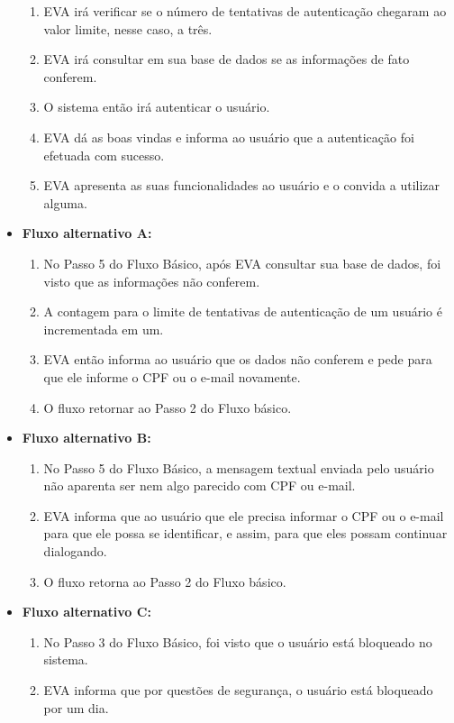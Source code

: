\begin{itemize}
\begin{enumerate}
            \item EVA irá verificar se o número de tentativas de autenticação chegaram ao valor limite, nesse caso, a três.
            \item EVA irá consultar em sua base de dados se as informações de fato conferem.
            \item O sistema então irá autenticar o usuário.
            \item EVA dá as boas vindas e informa ao usuário que a autenticação foi efetuada com sucesso.
            \item EVA apresenta as suas funcionalidades ao usuário e o convida a utilizar alguma.
        \end{enumerate}
    \item \textbf{Fluxo alternativo A:}
        \begin{enumerate}
            \item No Passo 5 do Fluxo Básico, após EVA consultar sua base de dados, foi visto que as informações não conferem.
            \item A contagem para o limite de tentativas de autenticação de um usuário é incrementada em um.
            \item EVA então informa ao usuário que os dados não conferem e pede para que ele informe o CPF ou o e-mail novamente.
            \item O fluxo retornar ao Passo 2 do Fluxo básico.
        \end{enumerate}
    \item \textbf{Fluxo alternativo B:}
        \begin{enumerate}
            \item No Passo 5 do Fluxo Básico, a mensagem textual enviada pelo usuário não aparenta ser nem algo parecido com CPF ou e-mail.
            \item EVA informa que ao usuário que ele precisa informar o CPF ou o e-mail para que ele possa se identificar, e assim, para que eles possam continuar dialogando.
            \item O fluxo retorna ao Passo 2 do Fluxo básico.
        \end{enumerate}
    \item \textbf{Fluxo alternativo C:}
        \begin{enumerate}
            \item No Passo 3 do Fluxo Básico, foi visto que o usuário está bloqueado no sistema.
            \item EVA informa que por questões de segurança, o usuário está bloqueado por um dia.

\end{enumerate}
\end{itemize}
